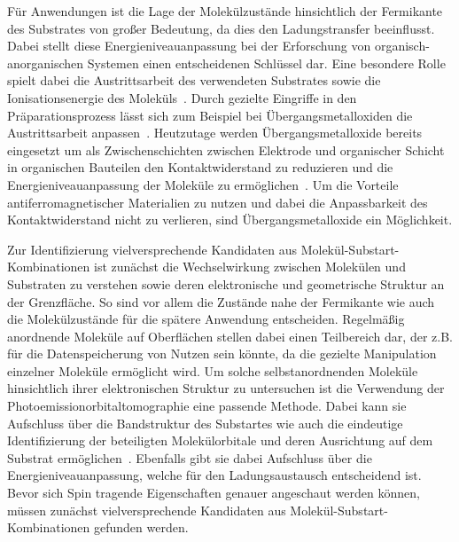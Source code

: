     Für Anwendungen ist die Lage der Molekülzustände hinsichtlich der Fermikante des Substrates von großer Bedeutung, da dies den Ladungstransfer beeinflusst.
    Dabei stellt diese Energieniveauanpassung bei der Erforschung von organisch-anorganischen Systemen einen entscheidenen Schlüssel dar.
    Eine besondere Rolle spielt dabei die Austrittsarbeit des verwendeten Substrates sowie die Ionisationsenergie des Moleküls~\cite{5A_3}.
    Durch gezielte Eingriffe in den Präparationsprozess lässt sich zum Beispiel bei Übergangsmetalloxiden die Austrittsarbeit anpassen~\cite{5A_4}.
    Heutzutage werden Übergangsmetalloxide bereits eingesetzt um als Zwischenschichten zwischen Elektrode und organischer Schicht in organischen Bauteilen den Kontaktwiderstand zu reduzieren und die Energieniveauanpassung der Moleküle zu ermöglichen~\cite{IF_11}.
    Um die Vorteile antiferromagnetischer Materialien zu nutzen und dabei die Anpassbarkeit des Kontaktwiderstand nicht zu verlieren, sind Übergangsmetalloxide ein Möglichkeit.

    Zur Identifizierung vielversprechende Kandidaten aus Molekül-Substart-Kombinationen ist zunächst die Wechselwirkung zwischen Molekülen und Substraten zu verstehen sowie deren elektronische und geometrische Struktur an der Grenzfläche.
    So sind vor allem die Zustände nahe der Fermikante wie auch die Molekülzustände für die spätere Anwendung entscheiden.
    Regelmäßig anordnende Moleküle auf Oberflächen stellen dabei einen Teilbereich dar, der z.B. für die Datenspeicherung von Nutzen sein könnte, da die gezielte Manipulation einzelner Moleküle ermöglicht wird.
    Um solche selbstanordnenden Moleküle hinsichtlich ihrer elektronischen Struktur zu untersuchen ist die Verwendung der Photoemissionorbitaltomographie eine passende Methode.
    Dabei kann sie Aufschluss über die Bandstruktur des Substartes wie auch die eindeutige Identifizierung der beteiligten Molekülorbitale und deren Ausrichtung auf dem Substrat ermöglichen~\cite{MM_2, MM_5}.
    Ebenfalls gibt sie dabei Aufschluss über die Energieniveauanpassung, welche für den Ladungsaustausch entscheidend ist.
    Bevor sich Spin tragende Eigenschaften genauer angeschaut werden können, müssen zunächst vielversprechende Kandidaten aus Molekül-Substart-Kombinationen gefunden werden.

